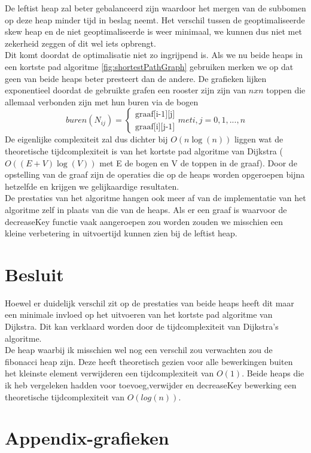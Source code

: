 \documentclass[10pt,a4paper,twoside]{article}
\begin{document}
De leftist heap zal beter gebalanceerd zijn waardoor het mergen van de subbomen op deze heap minder tijd in beslag neemt. Het verschil tussen de geoptimaliseerde skew heap en de niet geoptimaliseerde is weer minimaal, we kunnen dus niet met zekerheid zeggen of dit wel iets opbrengt.\\
Dit komt doordat de optimalisatie niet zo ingrijpend is.
Als we nu beide heaps in een kortste pad algoritme \ref{fig:shortestPathGraph} gebruiken merken we op dat geen van beide heaps beter presteert dan de andere. De grafieken lijken exponentieel doordat de gebruikte grafen een rooster zijn zijn van $nxn$ toppen die allemaal verbonden zijn met hun buren via de bogen
$$buren(N_{ij})=\begin{cases}
       \text{graaf[i-1][j]}\\
       \text{graaf[i][j-1]}
     \end{cases} met i,j=0,1,...,n$$
De eigenlijke complexiteit zal dus dichter bij $O(n\log(n))$ liggen wat de theoretische tijdcomplexiteit is van het kortste pad algoritme van Dijkstra ($O((E+V)\log(V))$ met E de bogen en V de toppen in de graaf).
Door de opstelling van de graaf zijn de operaties die op de heaps worden opgeroepen bijna hetzelfde en krijgen we gelijkaardige resultaten.\\
De prestaties van het algoritme hangen ook meer af van de implementatie van het algoritme zelf in plaats van die van de heaps. Als er een graaf is waarvoor de {\selectfont decreaseKey} functie vaak aangeroepen zou worden zouden we misschien een kleine verbetering in uitvoertijd kunnen zien bij de leftist heap.


\section{Besluit}
Hoewel er duidelijk verschil zit op de prestaties van beide heaps heeft dit maar een minimale invloed op het uitvoeren van het kortste pad algoritme van Dijkstra. Dit kan verklaard worden door de tijdcomplexiteit van Dijkstra's algoritme.\\
De heap waarbij ik misschien wel nog een verschil zou verwachten zou de fibonacci heap zijn. Deze heeft theoretisch gezien voor alle bewerkingen buiten het kleinste element verwijderen een tijdcomplexiteit van $O(1)$. Beide heaps die ik heb vergeleken hadden voor toevoeg,verwijder en decreaseKey bewerking een theoretische tijdcomplexiteit van $O(log(n))$.
\newpage

\section{Appendix-grafieken}
\end{document}
